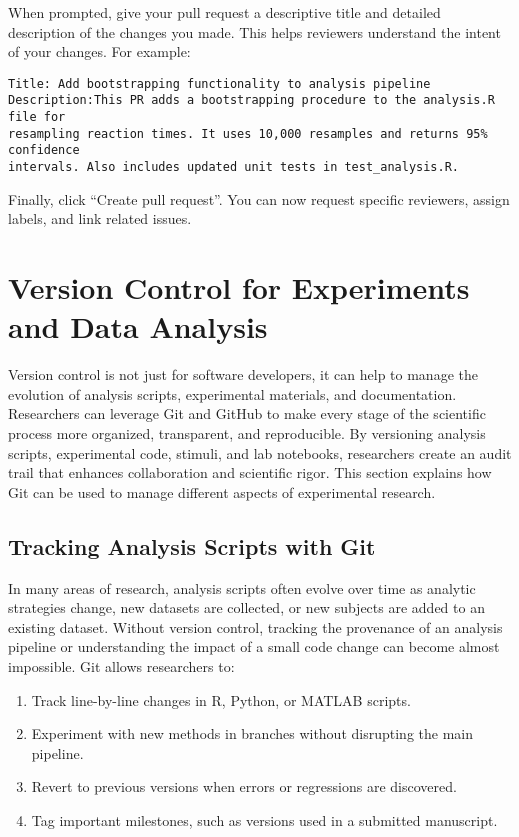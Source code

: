 When prompted, give your pull request a descriptive title and detailed description of the changes you made. This helps reviewers understand the intent of your changes. For example:

\texttt{Title: Add bootstrapping functionality to analysis pipeline}\\
\texttt{Description:This PR adds a bootstrapping procedure to the analysis.R file for\\
 resampling reaction times. It uses 10,000 resamples and returns 95\% confidence\\
 intervals. Also includes updated unit tests in test\_analysis.R.}

Finally, click ``Create pull request''. You can now request specific reviewers, assign labels, and link related issues.

\section{Version Control for Experiments and Data Analysis}
Version control is not just for software developers, it can help to manage the evolution of analysis scripts, experimental materials, and documentation. Researchers can leverage Git and GitHub to make every stage of the scientific process more organized, transparent, and reproducible. By versioning analysis scripts, experimental code, stimuli, and lab notebooks, researchers create an audit trail that enhances collaboration and scientific rigor. This section explains how Git can be used to manage different aspects of experimental research.

\subsection*{Tracking Analysis Scripts with Git}
In many areas of research, analysis scripts often evolve over time as analytic strategies change, new datasets are collected, or new subjects are added to an existing dataset. Without version control, tracking the provenance of an analysis pipeline or understanding the impact of a small code change can become almost impossible. Git allows researchers to:
\begin{enumerate}
\item Track line-by-line changes in R, Python, or MATLAB scripts.
\item Experiment with new methods in branches without disrupting the main pipeline.
\item Revert to previous versions when errors or regressions are discovered.
\item Tag important milestones, such as versions used in a submitted manuscript.
\end{enumerate}

